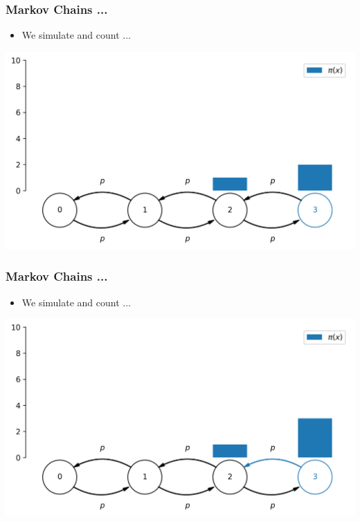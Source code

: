 \begin{frame}[c]
    \frametitle{Markov Chains ...}
    \begin{itemize}
        \item We simulate and count ...
    \end{itemize}
    \begin{center}
        \includegraphics[scale=0.6]{imgs/simulation2.png}
    \end{center}
\end{frame}

\begin{frame}[c]
    \frametitle{Markov Chains ...}
    \begin{itemize}
        \item We simulate and count ...
    \end{itemize}
    \begin{center}
        \includegraphics[scale=0.6]{imgs/simulation3.png}
    \end{center}
\end{frame}

